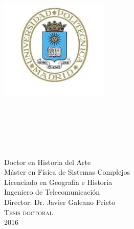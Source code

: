 \documentclass[
11pt, %
spanish, %
onehalfspacing, %
]{MastersDoctoralThesis_custom} %
\author{Francisco Javier \textsc{García Algarra}} %
\begin{document}
\frontmatter %

\pagestyle{plain} %

\begin{titlepage}
\begin{center}
\includegraphics[scale=0.6]{Figures/logoupm.jpg}

\textsc{\Large \univname}\\
\textsc{\large \deptname}\\
\textsc{\large \groupname}\\[4.0cm] %

{\huge \textsc \ttitle}\\[5cm] %
{\Large \authorname}\\[0.15cm]
\small Doctor en Historia del Arte\\
\small Máster en Física de Sistemas Complejos\\
\small Licenciado en Geografía e Historia\\
\small Ingeniero de Telecomunicación\\[1.0cm] 
\Large{{Director: }{Dr. Javier Galeano Prieto}}\\[1cm]
\textsc{\Large Tesis doctoral}\\[0.5cm] %
{\large 2016}\\[4cm] %
 
\vfill
\end{center}
\end{titlepage}


\end{document}
